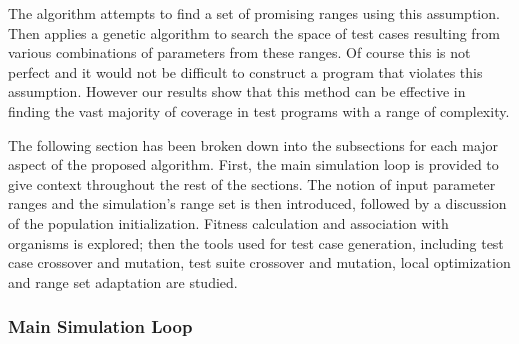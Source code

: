 \documentclass[runningheads]{llncs}
\begin{document}
The algorithm attempts to find a set of promising ranges using this assumption. Then applies a genetic algorithm to search the space of test cases resulting from various combinations of parameters from these ranges. Of course this is not perfect and it would not be difficult to construct a program that violates this assumption. However our results show that this method can be effective in finding the vast majority of coverage in test programs with a range of complexity.

The following section has been broken down into the subsections for each major aspect of the proposed algorithm. First, the main simulation loop is provided to give context throughout the rest of the sections. The notion of input parameter ranges and the simulation's range set is then introduced, followed by a discussion of the population initialization. Fitness calculation and association with organisms is explored; then the tools used for test case generation, including test case crossover and mutation, test suite crossover and mutation, local optimization and range set adaptation are studied.

\begin{comment}
Do you think this name is ok? I ask because techincally it shows both the initialization and the main loop. 
We could call it somthing like 'Algorithm Overview' or 'Simulation Algorithm'.
\end{comment}
\subsubsection{Main Simulation Loop}
\end{document}
